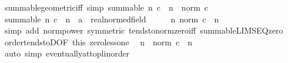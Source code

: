 \begin{isabellebody}
\endisatagproof
{\isafoldproof}%
%
\isadelimproof
\isanewline
%
\endisadelimproof
\isanewline
{}\isamarkupfalse%
\ summable{\isacharunderscore}{\kern0pt}geometric{\isacharunderscore}{\kern0pt}iff\ {\isacharbrackleft}{\kern0pt}simp{\isacharbrackright}{\kern0pt}{\isacharcolon}{\kern0pt}\ {\isachardoublequoteopen}summable\ {\isacharparenleft}{\kern0pt}{\isasymlambda}n{\isachardot}{\kern0pt}\ c\ {\isacharcircum}{\kern0pt}\ n{\isacharparenright}{\kern0pt}\ {\isasymlongleftrightarrow}\ norm\ c\ {\isacharless}{\kern0pt}\ {}{\isachardoublequoteclose}\isanewline
%
\isadelimproof
%
\endisadelimproof
%
\isatagproof
{}\isamarkupfalse%
\isanewline
\ \ \isamarkupfalse%
\ {\isachardoublequoteopen}summable\ {\isacharparenleft}{\kern0pt}{\isasymlambda}n{\isachardot}{\kern0pt}\ c\ {\isacharcircum}{\kern0pt}\ n\ {\isacharcolon}{\kern0pt}{\isacharcolon}{\kern0pt}\ {\isacharprime}{\kern0pt}a\ {\isacharcolon}{\kern0pt}{\isacharcolon}{\kern0pt}\ real{\isacharunderscore}{\kern0pt}normed{\isacharunderscore}{\kern0pt}field{\isacharparenright}{\kern0pt}{\isachardoublequoteclose}\isanewline
\ \ \isamarkupfalse%
\ \isamarkupfalse%
\ {\isachardoublequoteopen}{\isacharparenleft}{\kern0pt}{\isasymlambda}n{\isachardot}{\kern0pt}\ norm\ c\ {\isacharcircum}{\kern0pt}\ n{\isacharparenright}{\kern0pt}\ {\isasymlonglonglongrightarrow}\ {}{\isachardoublequoteclose}\isanewline
\ \ \ \ \isamarkupfalse%
\ {\isacharparenleft}{\kern0pt}simp\ add{\isacharcolon}{\kern0pt}\ norm{\isacharunderscore}{\kern0pt}power\ {\isacharbrackleft}{\kern0pt}symmetric{\isacharbrackright}{\kern0pt}\ tendsto{\isacharunderscore}{\kern0pt}norm{\isacharunderscore}{\kern0pt}zero{\isacharunderscore}{\kern0pt}iff\ summable{\isacharunderscore}{\kern0pt}LIMSEQ{\isacharunderscore}{\kern0pt}zero{\isacharparenright}{\kern0pt}\isanewline
\ \ \isamarkupfalse%
\ order{\isacharunderscore}{\kern0pt}tendstoD{\isacharparenleft}{\kern0pt}{}{\isacharparenright}{\kern0pt}{\isacharbrackleft}{\kern0pt}OF\ this\ zero{\isacharunderscore}{\kern0pt}less{\isacharunderscore}{\kern0pt}one{\isacharbrackright}{\kern0pt}\ \isamarkupfalse%
\ n\ \ {\isachardoublequoteopen}norm\ c\ {\isacharcircum}{\kern0pt}\ n\ {\isacharless}{\kern0pt}\ {}{\isachardoublequoteclose}\isanewline
\ \ \ \ \isamarkupfalse%
\ {\isacharparenleft}{\kern0pt}auto\ simp{\isacharcolon}{\kern0pt}\ eventually{\isacharunderscore}{\kern0pt}at{\isacharunderscore}{\kern0pt}top{\isacharunderscore}{\kern0pt}linorder{\isacharparenright}{\kern0pt}\isanewline

\end{isabellebody}

